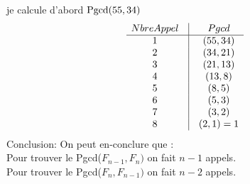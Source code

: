 \begin{enumerate}[\bf 1)]
\begin{framed}
je calcule d'abord ${\rm Pgcd}(55,34)$
\setcounter{MaxMatrixCols}{20}
\[
\begin{matrix}
 Nbre Appel&\vline&Pgcd \\
\hline
1&\vline&(55,34)  \\
2&\vline&(34,21)  \\
3&\vline&(21,13)  \\
4&\vline&(13,8)\\
5&\vline&(8,5)\\
6&\vline&(5,3)\\
7&\vline&(3,2)\\
8&\vline&(2,1)=1\\
\end{matrix}
\]
Conclusion: On peut en-conclure que :\\
Pour trouver le Pgcd($F_{n-1},F_n)$ on fait $n-1$ appels.\\
Pour trouver le Pgcd($F_n,F_{n-1})$ on fait $n-2$ appels.

\end{framed}
\end{enumerate}


